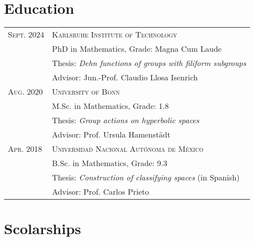 \documentclass[a4paper,11pt]{article} %
\begin{document}

\section{Education}

\begin{longtable}{>{\raggedleft\arraybackslash}p{4cm}p{10cm}}
\textsc{Sept.} 2024 & \textsc{Karlsruhe Institute of Technology} \vspace{0.3em} \\
& PhD in Mathematics, Grade: Magna Cum Laude \vspace{0.3em}\\
& \quad Thesis: \emph{Dehn functions of groups with filiform subgroups}\\ 
& \quad Advisor: Jun.-Prof. Claudio Llosa Isenrich \vspace{0.5em}\\

\textsc{Aug.} 2020& \textsc{University of Bonn} \vspace{0.3em}\\
&M.Sc. in Mathematics, Grade: 1.8 \vspace{0.3em}\\
& \quad Thesis: \emph{Group actions on hyperbolic spaces}\\ 
& \quad Advisor: Prof. Ursula Hamenstädt \vspace{0.5em}\\

\textsc{Apr.} 2018& \textsc{Universidad Nacional Autónoma de México} \vspace{0.3em}\\ 
& B.Sc. in Mathematics, Grade: 9.3 \vspace{0.3em}\\
& \quad Thesis: \emph{Construction of classifying spaces} (in Spanish)\\ 
& \quad Advisor: Prof. Carlos Prieto\\
\end{longtable}


\section{Scolarships}
\end{document}
